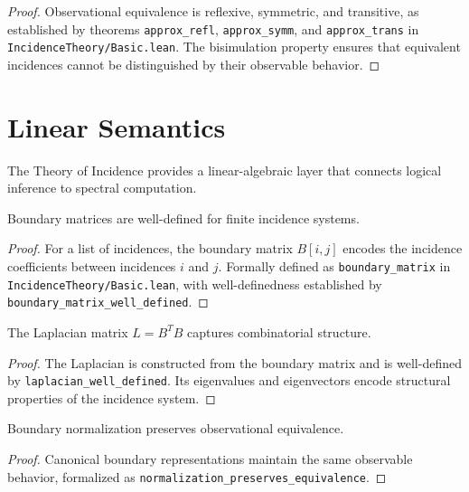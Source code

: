 \documentclass{article}
\begin{document}
\begin{proof}
Observational equivalence is reflexive, symmetric, and transitive, as established by theorems \texttt{approx\_refl}, \texttt{approx\_symm}, and \texttt{approx\_trans} in \texttt{IncidenceTheory/Basic.lean}. The bisimulation property ensures that equivalent incidences cannot be distinguished by their observable behavior.
\end{proof}

\section{Linear Semantics}

The Theory of Incidence provides a linear-algebraic layer that connects logical inference to spectral computation.

\begin{theorem}
\label{thm:boundary-matrix}
Boundary matrices are well-defined for finite incidence systems.
\end{theorem}

\begin{proof}
For a list of incidences, the boundary matrix $B[i,j]$ encodes the incidence coefficients between incidences $i$ and $j$. Formally defined as \texttt{boundary\_matrix} in \texttt{IncidenceTheory/Basic.lean}, with well-definedness established by \texttt{boundary\_matrix\_well\_defined}.
\end{proof}

\begin{theorem}
\label{thm:laplacian}
The Laplacian matrix $L = B^T B$ captures combinatorial structure.
\end{theorem}

\begin{proof}
The Laplacian is constructed from the boundary matrix and is well-defined by \texttt{laplacian\_well\_defined}. Its eigenvalues and eigenvectors encode structural properties of the incidence system.
\end{proof}

\begin{theorem}
\label{thm:normalization}
Boundary normalization preserves observational equivalence.
\end{theorem}

\begin{proof}
Canonical boundary representations maintain the same observable behavior, formalized as \texttt{normalization\_preserves\_equivalence}.
\end{proof}
\end{document}

